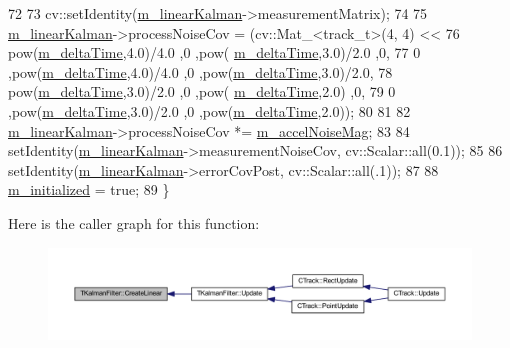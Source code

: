 \begin{DoxyCode}
72 
73     cv::setIdentity(\mbox{\hyperlink{class_t_kalman_filter_aec607aacb57ef1f78e514c6b3ef18435}{m\_linearKalman}}->measurementMatrix);
74 
75     \mbox{\hyperlink{class_t_kalman_filter_aec607aacb57ef1f78e514c6b3ef18435}{m\_linearKalman}}->processNoiseCov = (cv::Mat\_<track\_t>(4, 4) <<
76                                        pow(\mbox{\hyperlink{class_t_kalman_filter_a7335e3bd7a695ebaf5eaa93c42e39eae}{m\_deltaTime}},4.0)/4.0  ,0                      ,pow(
      \mbox{\hyperlink{class_t_kalman_filter_a7335e3bd7a695ebaf5eaa93c42e39eae}{m\_deltaTime}},3.0)/2.0     ,0,
77                                        0                        ,pow(\mbox{\hyperlink{class_t_kalman_filter_a7335e3bd7a695ebaf5eaa93c42e39eae}{m\_deltaTime}},4.0)/4.0    ,0                          
      ,pow(\mbox{\hyperlink{class_t_kalman_filter_a7335e3bd7a695ebaf5eaa93c42e39eae}{m\_deltaTime}},3.0)/2.0,
78                                        pow(\mbox{\hyperlink{class_t_kalman_filter_a7335e3bd7a695ebaf5eaa93c42e39eae}{m\_deltaTime}},3.0)/2.0  ,0                      ,pow(
      \mbox{\hyperlink{class_t_kalman_filter_a7335e3bd7a695ebaf5eaa93c42e39eae}{m\_deltaTime}},2.0)         ,0,
79                                        0                        ,pow(\mbox{\hyperlink{class_t_kalman_filter_a7335e3bd7a695ebaf5eaa93c42e39eae}{m\_deltaTime}},3.0)/2.0    ,0                          
      ,pow(\mbox{\hyperlink{class_t_kalman_filter_a7335e3bd7a695ebaf5eaa93c42e39eae}{m\_deltaTime}},2.0));
80 
81 
82     \mbox{\hyperlink{class_t_kalman_filter_aec607aacb57ef1f78e514c6b3ef18435}{m\_linearKalman}}->processNoiseCov *= \mbox{\hyperlink{class_t_kalman_filter_a9f511e8885e5e89643fa6d59ea7bbd27}{m\_accelNoiseMag}};
83 
84     setIdentity(\mbox{\hyperlink{class_t_kalman_filter_aec607aacb57ef1f78e514c6b3ef18435}{m\_linearKalman}}->measurementNoiseCov, cv::Scalar::all(0.1));
85 
86     setIdentity(\mbox{\hyperlink{class_t_kalman_filter_aec607aacb57ef1f78e514c6b3ef18435}{m\_linearKalman}}->errorCovPost, cv::Scalar::all(.1));
87 
88     \mbox{\hyperlink{class_t_kalman_filter_a5633e302e878261c8669816695f6a314}{m\_initialized}} = \textcolor{keyword}{true};
89 \}
\end{DoxyCode}
Here is the caller graph for this function\+:\nopagebreak
\begin{figure}[H]
\begin{center}
\leavevmode
\includegraphics[width=350pt]{class_t_kalman_filter_a6b1bb8fb881f82ce0a766e6ea41f159c_icgraph}
\end{center}
\end{figure}
\mbox{\label{class_t_kalman_filter_a1141fb38b6e9bfb1bef0d16686569978}} 
